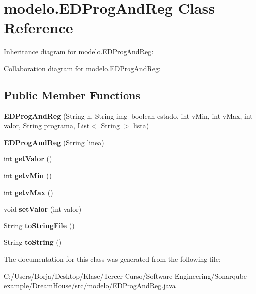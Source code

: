 \hypertarget{classmodelo_1_1_e_d_prog_and_reg}{}\section{modelo.\+E\+D\+Prog\+And\+Reg Class Reference}
\label{classmodelo_1_1_e_d_prog_and_reg}


Inheritance diagram for modelo.\+E\+D\+Prog\+And\+Reg\+:


Collaboration diagram for modelo.\+E\+D\+Prog\+And\+Reg\+:
\subsection*{Public Member Functions}
\begin{DoxyCompactItemize}
\item 
\mbox{\label{classmodelo_1_1_e_d_prog_and_reg_a59fd32988f0e7886544d49601d554d11}} 
{\bfseries E\+D\+Prog\+And\+Reg} (String n, String img, boolean estado, int v\+Min, int v\+Max, int valor, String programa, List$<$ String $>$ lista)
\item 
\mbox{\label{classmodelo_1_1_e_d_prog_and_reg_a0c934bb38fa4acafb27014c962966c86}} 
{\bfseries E\+D\+Prog\+And\+Reg} (String linea)
\item 
\mbox{\label{classmodelo_1_1_e_d_prog_and_reg_a357c68f3e389b1b7be1d0991ca1af7f4}} 
int {\bfseries get\+Valor} ()
\item 
\mbox{\label{classmodelo_1_1_e_d_prog_and_reg_a1f67e7a977bd3c7ed6a551f103dda7b2}} 
int {\bfseries getv\+Min} ()
\item 
\mbox{\label{classmodelo_1_1_e_d_prog_and_reg_a606f1c6e59684cf36e9e232f1c8c74b5}} 
int {\bfseries getv\+Max} ()
\item 
\mbox{\label{classmodelo_1_1_e_d_prog_and_reg_acd217e74e210b80ab0ae9028d8d2e238}} 
void {\bfseries set\+Valor} (int valor)
\item 
\mbox{\label{classmodelo_1_1_e_d_prog_and_reg_a9bb036d2596a73b2af9a9959ad564b31}} 
String {\bfseries to\+String\+File} ()
\item 
\mbox{\label{classmodelo_1_1_e_d_prog_and_reg_a7f61e2cc66f9d7adb21d0829e6b49d06}} 
String {\bfseries to\+String} ()
\end{DoxyCompactItemize}


The documentation for this class was generated from the following file\+:\begin{DoxyCompactItemize}
\item 
C\+:/\+Users/\+Borja/\+Desktop/\+Klase/\+Tercer Curso/\+Software Engineering/\+Sonarqube example/\+Dream\+House/src/modelo/E\+D\+Prog\+And\+Reg.\+java\end{DoxyCompactItemize}
